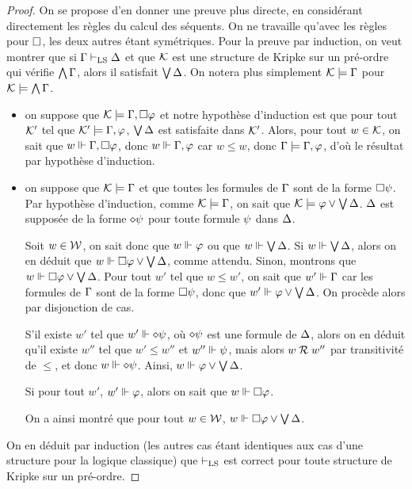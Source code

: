 \begin{proof}
  On se propose d'en donner une preuve plus directe, en considérant directement
  les règles du calcul des séquents. On ne travaille qu'avec les règles pour
  $\mathbin{\square}$, les deux autres étant symétriques. Pour la preuve par induction,
  on veut montrer que si $\Gamma\vdash_{\operatorname{LS}}\Delta$ et que $\mathcal{K}$ est une structure
  de Kripke sur un pré-ordre qui vérifie $\bigwedge\Gamma$, alors il satisfait
  $\bigvee \Delta$. On notera plus simplement $\mathcal{K} \models\Gamma$ pour
  $\mathcal{K}\models\bigwedge\Gamma$.

  \begin{itemize}
  \item[$\Rlsq$~:] on suppose que
    $\mathcal{K} \models \Gamma,\mathbin{\square}\varphi$ et notre hypothèse d'induction est que
    pour tout $\mathcal{K}'$ tel que $\mathcal{K}' \models\Gamma,\varphi$, $\bigvee\Delta$
    est satisfaite dans $\mathcal{K}'$.
    Alors, pour tout $w \in \mathcal{K}$, on sait que $w\Vdash\Gamma,\mathbin{\square}\varphi$,
    donc $w\Vdash\Gamma,\varphi$ car $w\leq w$, donc
    $\Gamma \models \Gamma,\varphi$,
    d'où le résultat par hypothèse d'induction.
  \item[$\Rrsq^\ddagger$~:] on suppose que $\mathcal{K} \models \Gamma$ et que toutes
    les formules de $\Gamma$ sont de la forme $\mathbin{\square} \psi$. Par hypothèse 
    d'induction, comme $\mathcal{K} \models \Gamma$, on sait que
    $\mathcal{K}\models \varphi\lor\bigvee\Delta$. $\Delta$ est supposée de la
    forme $\mathbin{\diamond} \psi$ pour toute formule $\psi$ dans $\Delta$.

    Soit $w \in \mathcal{W}$, on sait donc que $w\Vdash \varphi$ ou que
    $w\Vdash \bigvee\Delta$. Si $w\Vdash\bigvee\Delta$, alors on en
    déduit que $w\Vdash\mathbin{\square}\varphi\lor\bigvee\Delta$, comme attendu.
    Sinon, montrons que $w\Vdash\mathbin{\square}\varphi\lor\bigvee\Delta$.
    Pour tout $w'$ tel que $w\leq w'$, on sait que $w'\Vdash\Gamma$ car les
    formules de $\Gamma$ sont de la forme $\mathbin{\square}\psi$, donc que
    $w'\Vdash\varphi\lor\bigvee\Delta$. On procède alors par disjonction de cas.

    S'il existe $w'$ tel que $w'\Vdash\mathbin{\diamond}\psi$, où $\mathbin{\diamond}\psi$ est une
    formule de $\Delta$, alors on en déduit qu'il existe $w''$ tel que
    $w'\leq w''$ et $w''\Vdash \psi$, mais alors $w\mathrel{\mathcal{R}} w''$ par transitivité
    de $\leq$, et donc $w\Vdash\mathbin{\diamond} \psi$. Ainsi,
    $w\Vdash\varphi\lor\bigvee\Delta$.

    Si pour tout $w'$, $w'\Vdash\varphi$, alors on sait que
    $w\Vdash\mathbin{\square}\varphi$.

    On a ainsi montré que pour tout $w\in \mathcal{W}$,
    $w\Vdash\mathbin{\square}\varphi\lor\bigvee\Delta$.
  \end{itemize}
  On en déduit par induction (les autres cas étant identiques aux cas d'une
  structure pour la logique classique) que $\vdash_{\operatorname{LS}}$ est correct pour toute
  structure de Kripke sur un pré-ordre.
\end{proof}

